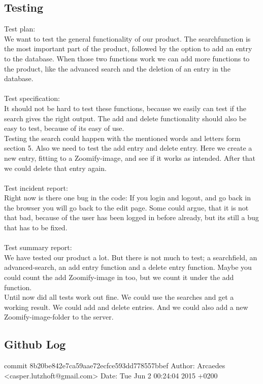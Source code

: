 \documentclass[12pt,a4paper]{article}
\begin{document}
\subsection{Testing}
Test plan: \\
We want to test the general functionality of our product. The searchfunction is the most important part of the product, followed by the option to add an entry to the database. When those two functions work we can add more functions to the product, like the advanced search and the deletion of an entry in the database.\\\\
Test specification:\\
It should not be hard to test these functions, because we easily can test if the search gives the right output. The add and delete functionality should also be easy to test, because of its easy of use.\\
Testing the search could happen with the mentioned words and letters form section 5. Also we need to test the add entry and delete entry. Here we create a new entry, fitting to a Zoomify-image, and see if it works as intended. After that we could delete that entry again.\\\\
Test incident report:\\
Right now is there one bug in the code: If you login and logout, and go back in the browser you will go back to the edit page. Some could argue, that it is not that bad, because of the user has been logged in before already, but its still a bug that has to be fixed.\\\\
Test summary report:\\
We have tested our product a lot. But there is not much to test; a searchfield, an advanced-search, an add entry function and a delete entry function. Maybe you could count the add Zoomify-image in too, but we count it under the add function.\\
Until now did all tests work out fine. We could use the searches and get a working result. We could add and delete entries. And we could also add a new Zoomify-image-folder to the server.
\newpage
\subsection{Github Log}
\noindent\makebox[\linewidth]{\rule{16.5cm}{0.4pt}}
commit 8b20be842e7ca59aae72ecfce593dd778557bbef
Author: Arcaedes <casper.lutzhoft@gmail.com>
Date:   Tue Jun 2 00:24:04 2015 +0200
\end{document}
